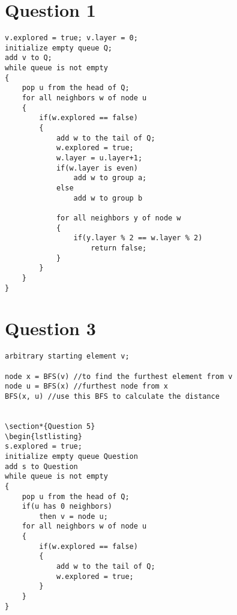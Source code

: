 \documentclass[11pt]{article}
\begin{document}
\maketitle


\section*{Question 1}
\begin{lstlisting}
v.explored = true; v.layer = 0;
initialize empty queue Q;
add v to Q;
while queue is not empty
{
	pop u from the head of Q;
	for all neighbors w of node u
	{
		if(w.explored == false)
		{
			add w to the tail of Q;
			w.explored = true;
			w.layer = u.layer+1;
			if(w.layer is even)
				add w to group a;
			else
				add w to group b
				
			for all neighbors y of node w
			{
				if(y.layer % 2 == w.layer % 2)
					return false;
			}
		}
	}
}
\end{lstlisting}


\section*{Question 3}
\begin{lstlisting}
arbitrary starting element v;

node x = BFS(v) //to find the furthest element from v
node u = BFS(x) //furthest node from x
BFS(x, u) //use this BFS to calculate the distance


\section*{Question 5}
\begin{lstlisting}
s.explored = true;
initialize empty queue Question
add s to Question
while queue is not empty
{
	pop u from the head of Q;
	if(u has 0 neighbors)
		then v = node u;
	for all neighbors w of node u
	{
		if(w.explored == false)
		{
			add w to the tail of Q;
			w.explored = true;
		}
	}
}
\end{lstlisting}
\end{document}
